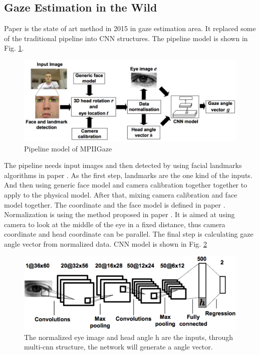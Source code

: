 \documentclass[senior]{IPSstyle}
\begin{document}
\subsection{Gaze Estimation in the Wild}
Paper \cite{zhang2015appearance} is the state of art method in 2015 in gaze estimation area.
It replaced some of the traditional pipeline into CNN structures.
The pipeline model is shown in Fig. \ref{fig:csm_pipeline}.
\begin{figure}[h]
    \centering
    \includegraphics[scale=1.3]{MasterThesis-master/images/csm_MPIIGaze_pipeline.png}
    \caption{Pipeline model of MPIIGaze}
    \label{fig:csm_pipeline}
\end{figure}
The pipeline needs input images and then detected by using facial landmarks algorithms in paper \cite{li2013learning}.
As the first step, landmarks are the one kind of the inputs.
And then using generic face model and camera calibration together together to apply to the physical model.
After that, mixing camera calibration and face model together.
The coordinate and the face model is defined in paper \cite{Sugano2014LearningbySynthesisFA}.
Normalization is using the method proposed in paper \cite{Sugano2014LearningbySynthesisFA}.
It is aimed at using camera to look at the middle of the eye in a fixed distance, thus camera coordinate and head coordinate can be parallel.
The final step is calculating gaze angle vector from normalized data.
CNN model is shown in Fig. \ref{fig:cnn_model}
\begin{figure}[h]
    \centering
    \includegraphics{MasterThesis-master/images/csm_MPIIGaze_cnnModel.png}
    \caption{The normalized eye image and head angle h are the inputs, through multi-cnn structure, the network will generate a angle vector.}
    \label{fig:cnn_model}
\end{figure}
\end{document}
